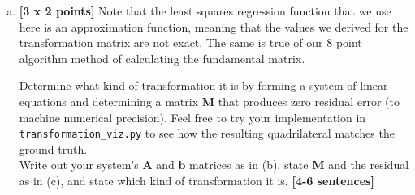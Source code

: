 \begin{enumerate}[(a)]
\item \textbf{[3 x 2 points]} Note that the least squares regression function that we use here is an approximation function, meaning that the values we derived for the transformation matrix are not exact. The same is true of our 8 point algorithm method of calculating the fundamental matrix.

\begin{tcolorbox}[colback=orange!5!white,colframe=orange!75!black]
Determine what kind of transformation it is by forming a system of linear equations and determining a matrix $\bm{M}$ that produces zero residual error (to machine numerical precision). Feel free to try your implementation in \texttt{transformation\_viz.py} to see how the resulting quadrilateral matches the ground truth.
\\ 
    
Write out your system's $\bm{A}$ and $\bm{b}$ matrices as in (b), state $\bm{M}$ and the residual as in (c), and state which kind of transformation it is. \textbf{[4-6 sentences]}
\end{tcolorbox}


\end{enumerate}





